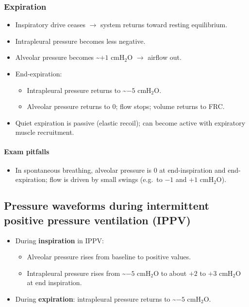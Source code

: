\documentclass[11pt,a4paper]{article}
\begin{document}
\subsubsection{Expiration}
\begin{itemize}[leftmargin=*,nosep]
  \item Inspiratory drive ceases $\rightarrow$ system returns toward resting equilibrium.
  \item Intrapleural pressure becomes less negative.
  \item Alveolar pressure becomes \textasciitilde $+1$ cmH$_2$O $\rightarrow$ airflow out.
  \item End-expiration:
  \begin{itemize}[leftmargin=*,nosep]
    \item Intrapleural pressure returns to \textasciitilde $-5$ cmH$_2$O.
    \item Alveolar pressure returns to 0; flow stops; volume returns to FRC.
  \end{itemize}
  \item Quiet expiration is passive (elastic recoil); can become active with expiratory muscle recruitment.
\end{itemize}

\paragraph{Exam pitfalls}
\begin{itemize}[leftmargin=*,nosep]
  \item In spontaneous breathing, alveolar pressure is 0 at end-inspiration and end-expiration; flow is driven by small swings (e.g.\ to $-1$ and $+1$ cmH$_2$O).
\end{itemize}

\subsection{Pressure waveforms during intermittent positive pressure ventilation (IPPV)}
\begin{itemize}[leftmargin=*,nosep]
  \item During \textbf{inspiration} in IPPV:
  \begin{itemize}[leftmargin=*,nosep]
    \item Alveolar pressure rises from baseline to positive values.
    \item Intrapleural pressure rises from \textasciitilde $-5$ cmH$_2$O to about $+2$ to $+3$ cmH$_2$O at end inspiration.
  \end{itemize}
  \item During \textbf{expiration}: intrapleural pressure returns to \textasciitilde $-5$ cmH$_2$O.
\end{itemize}
\end{document}
